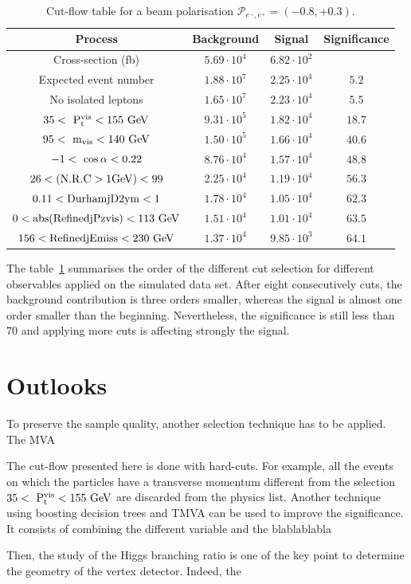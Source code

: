   \begin{table}
    \begin{tabular}{c c c c}
      \hline
      Process                                     & Background          & Signal              & Significance  \tabularnewline
      \hline
      \hline
      Cross-section (fb)                          & $5.69 \cdot 10^{4}$ & $6.82 \cdot 10^{2}$ &               \tabularnewline
      Expected event number                       & $1.88 \cdot 10^{7}$ & $2.25 \cdot 10^{4}$ & $5.2$         \tabularnewline
      No isolated leptons                         & $1.65 \cdot 10^{7}$ & $2.23 \cdot 10^{4}$ & $5.5$         \tabularnewline
      {$35 <~\rm{{P}_{t}^{vis}} < 155~\rm{GeV} $} & $9.31 \cdot 10^{5}$ & $1.82 \cdot 10^{4}$ & $18.7$        \tabularnewline
      {$95 <~\rm{m_{vis}}< 140~\rm{GeV}$}         & $1.50 \cdot 10^{5}$ & $1.66 \cdot 10^{4}$ & $40.6$        \tabularnewline
      {$-1 <~\rm{\cos{\alpha}}< 0.22$}            & $8.76 \cdot 10^{4}$ & $1.57 \cdot 10^{4}$ & $48.8$        \tabularnewline
      $26 < (\rm{N.R.C > 1GeV}) < 99$             & $2.25 \cdot 10^{4}$ & $1.19 \cdot 10^{4}$ & $56.3$        \tabularnewline
      $0.11 < \rm{DurhamjD2ym} < 1$               & $1.78 \cdot 10^{4}$ & $1.05 \cdot 10^{4}$ & $62.3$        \tabularnewline
      $0 < \rm{abs(RefinedjPzvis)} < 113~\rm{GeV}$& $1.51 \cdot 10^{4}$ & $1.01 \cdot 10^{4}$ & $63.5$        \tabularnewline
      $156 < \rm{RefinedjEmiss} < 230~\rm{GeV}$   & $1.37 \cdot 10^{4}$ & $9.85 \cdot 10^{3}$ & $64.1$        \tabularnewline      
    \end{tabular}
    \caption{Cut-flow table for a beam polarisation $\mathcal{P}_{e^{-},e^{+}} = (-0.8, +0.3)$.}
    \label{tab:cutFlow}
  \end{table}

  The table~\ref{tab:cutFlow} summarises the order of the different cut selection for different observables applied on the simulated data set.
  After eight consecutively cuts, the background contribution is three orders smaller, whereas the signal is almost one order smaller than the beginning.
  Nevertheless, the significance is still less than 70 and applying more cuts is affecting strongly the signal.

  \section{Outlooks}

  To preserve the sample quality, another selection technique has to be applied.
  The \gls{MVA}
  

  The cut-flow presented here is done with hard-cuts.
  For example, all the events on which the particles have a transverse momentum different from the selection $35 <~\rm{{P}_{t}^{vis}} < 155~\rm{GeV}$ are discarded from the physics list.
  Another technique using boosting decision trees and TMVA can be used to improve the significance.
  It consists of combining the different variable and the  blablablabla

  Then, the study of the Higgs branching ratio is one of the key point to determine the geometry of the vertex detector.
  Indeed, the 
